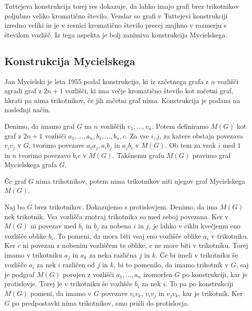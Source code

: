 \documentclass[mat1, tisk]{fmfdelo}
\begin{document}
Tuttejeva konstrukcija torej res dokazuje, da lahko imajo grafi brez trikotnikov poljubno veliko kromatično število. Vendar so grafi v Tuttejevi konstrukciji
izredno veliki in je v resnici kromatično število precej majhno v razmerju s številom vozlišč. Iz tega aspekta je bolj zanimiva konstrukcija Mycielskega.

\subsection{Konstrukcija Mycielskega}
Jan Mycielski je leta 1955 podal konstrukcijo, ki iz začetnega grafa z $n$ vozlišči zgradi graf z $2n + 1$ vozlišči, ki ima večje kromatično število kot
začetni graf, hkrati pa nima trikotnikov, če jih začetni graf nima. Konstrukcija je podana na naslednji način.

Denimo, da imamo graf $G$ na $n$ vozliščih ${v_1, \ldots, v_n}$. Potem definiramo $M(G)$ kot graf z $2n + 1$ vozlišči ${a_1, \ldots, a_n, b_1, \ldots, b_n, c}$. 
Za vse $i, j$, za katere obstaja povezava $v_iv_j$ v $G$, tvorimo povezave $a_ia_j, a_ib_j$ in $a_jb_i$ v $M(G)$. Ob tem za vsak $i$ med $1$ in $n$ tvorimo 
povezavo $b_ic$ v $M(G)$. Takšnemu grafu $M(G)$ pravimo graf Mycielskega grafa $G$.

    \begin{trditev}
        Če graf $G$ nima trikotnikov, potem nima trikotnikov niti njegov graf Mycielskega $M(G)$.
    \end{trditev}

    \begin{dokaz}
        Naj bo $G$ brez trikotnikov. Dokazujemo s protislovjem. Denimo, da ima $M(G)$ nek trikotnik. Vsa vozlišča znotraj trikotnika so med seboj povezana. Ker v $M(G)$ ni povezav med 
        $b_i$ in $b_j$ za nobena $i$ in $j$, je lahko v ciklu kvečjemu eno vozlišče oblike $b_i$. To pomeni, da mora biti vsaj eno vozlišče oblike $a_i$ v trikotniku.
        Ker $c$ ni povezan z nobenim vozliščem te oblike, $c$ ne more biti v trikotniku. Torej imamo v trikotniku $a_j$ in $a_k$ za neka različna $j$ in $k$. Če bi imeli v
        trikotniku še vozlišče $a_i$ za nek $i$ različen od $j$ in $k$, bi to pomenilo, da imamo trikotnik v $G$, saj je podgraf $M(G)$ porojen z vozlišči ${a_1, \ldots, a_n}$
        izomorfen $G$ po konstrukciji, kar je protislovje. Torej je v trikotniku še vozlišče $b_i$ za nek $i$. To pa po konstrukciji $M(G)$ pomeni, da imamo v $G$ povezave $v_iv_k$, $v_iv_j$
        in $v_jv_k$, kar je trikotnik. Ker $G$ po predpostavki nima trikotnikov, smo prišli do protislovja.
    \end{dokaz}
\end{document}
